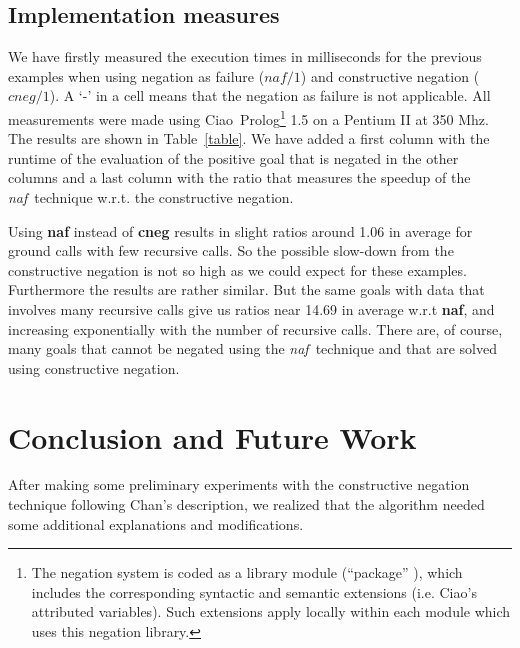 \documentclass{llncs}
\newcommand{\naf}{{\em naf}}\newcommand{\viejo}[1]{}
\newcommand{\ciao}{Ciao}
\begin{document}
\subsection{Implementation measures}

We have firstly measured the execution times in milliseconds for the
previous examples when using negation as failure ($naf/1$) and
constructive negation ($cneg/1$). A `-' in a cell means that the
negation as failure is not applicable. All measurements were made
using \ciao\ Prolog\footnote{The negation system is coded as a library
module (``package'' \cite{ciao-modules-cl2000}), which includes the
corresponding syntactic and semantic extensions (i.e. Ciao's
attributed variables). Such extensions apply locally within each
module which uses this negation library.} 1.5 on a Pentium II at 350
Mhz. The results are shown in Table~\ref{table}. We have added a first
column with the runtime of the evaluation of the positive goal that is
negated in the other columns and a last column with the ratio that
measures the speedup of the \naf\ technique w.r.t. the constructive
negation.

Using {\bf naf} instead of {\bf cneg} results in slight ratios around
1.06 in average for ground calls with few recursive calls. So the
possible slow-down from the constructive negation is not so high as we
could expect for these examples. Furthermore the results are rather
similar. But the same goals with data that involves many recursive
calls give us ratios near 14.69 in average w.r.t {\bf naf}, and
increasing exponentially with the number of recursive calls. There
are, of course, many goals that cannot be negated using the \naf\
technique and that are solved using constructive negation.

 


\vspace{-1em}
\section{Conclusion and Future Work}
\label{conclusion}
\vspace{-1em}
After making some preliminary experiments with the constructive 
negation technique  following Chan's description, we realized that the
algorithm needed some additional explanations and modifications.
\end{document}
